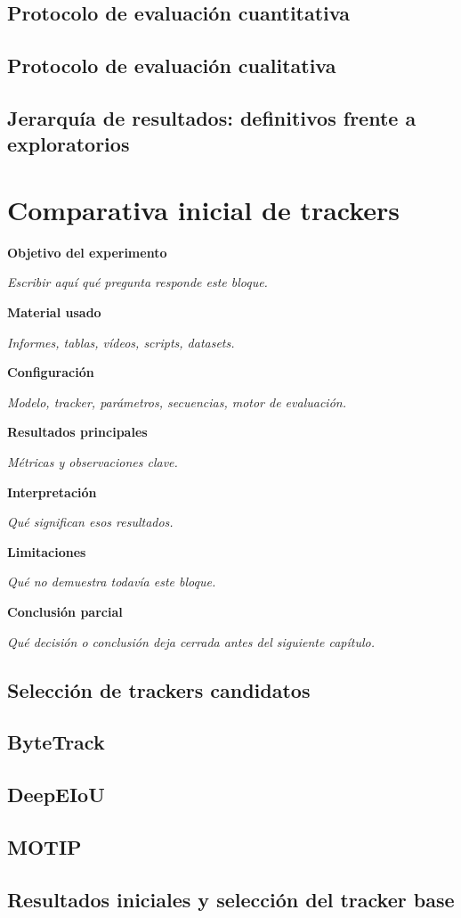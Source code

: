 \documentclass[12pt, a4paper, twoside]{article}
\newcommand{\templatefield}[2]{%
	\textbf{#1}\par
	{\color{gray!70!black}\emph{#2}}\par\vspace{0.5em}%
}
\newcommand{\experimentchaptertemplate}{%
	\begin{chaptertemplatebox}
		\templatefield{Objetivo del experimento}{Escribir aquí qué pregunta responde este bloque.}
		\templatefield{Material usado}{Informes, tablas, vídeos, scripts, datasets.}
		\templatefield{Configuración}{Modelo, tracker, parámetros, secuencias, motor de evaluación.}
		\templatefield{Resultados principales}{Métricas y observaciones clave.}
		\templatefield{Interpretación}{Qué significan esos resultados.}
		\templatefield{Limitaciones}{Qué no demuestra todavía este bloque.}
		\templatefield{Conclusión parcial}{Qué decisión o conclusión deja cerrada antes del siguiente capítulo.}
	\end{chaptertemplatebox}%
}
\begin{document}
	\subsection{Protocolo de evaluación cuantitativa}
	\subsection{Protocolo de evaluación cualitativa}
	\subsection{Jerarquía de resultados: definitivos frente a exploratorios}
	
	\newpage
	
	
	\section{Comparativa inicial de trackers}
	
	\experimentchaptertemplate
	
	\subsection{Selección de trackers candidatos}
	\subsection{ByteTrack}
	\subsection{DeepEIoU}
	\subsection{MOTIP}
	\subsection{Resultados iniciales y selección del tracker base}
	
	\newpage
	
	
\end{document}
